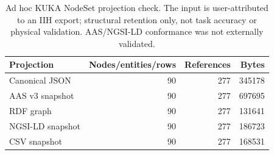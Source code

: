 \begin{table}[t]
\centering\footnotesize
\caption{Ad hoc KUKA NodeSet projection check. The input is user-attributed to an IIH export; structural retention only, not task accuracy or physical validation. AAS/NGSI-LD conformance was not externally validated.}
\label{tab:kuka-adhoc-projections}
\begin{tabular}{@{}lrrr@{}}
\toprule
Projection & Nodes/entities/rows & References & Bytes \\
\midrule
Canonical JSON & 90 & 277 & 345178 \\
AAS v3 snapshot & 90 & 277 & 697695 \\
RDF graph & 90 & 277 & 131641 \\
NGSI-LD snapshot & 90 & 277 & 186723 \\
CSV snapshot & 90 & 277 & 168531 \\
\bottomrule
\end{tabular}
\end{table}
